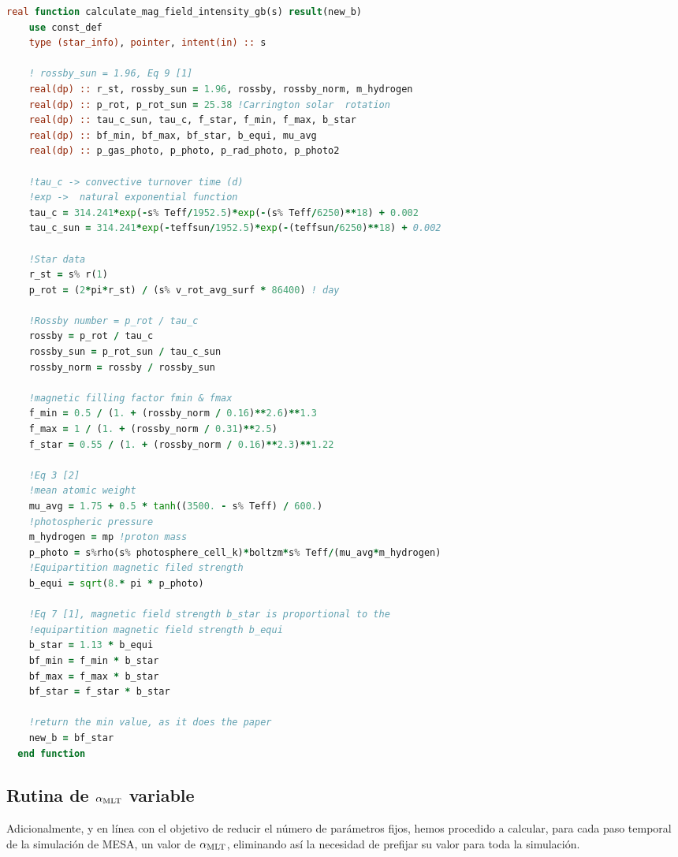 \begin{lstlisting}[language=Fortran, float, caption={Rutina de cálculo de intensidad de campo magnético.}, label={lst:jdot_mf_intensity}]
  real function calculate_mag_field_intensity_gb(s) result(new_b)
	use const_def
	type (star_info), pointer, intent(in) :: s
	
	! rossby_sun = 1.96, Eq 9 [1]
	real(dp) :: r_st, rossby_sun = 1.96, rossby, rossby_norm, m_hydrogen
	real(dp) :: p_rot, p_rot_sun = 25.38 !Carrington solar  rotation
	real(dp) :: tau_c_sun, tau_c, f_star, f_min, f_max, b_star
	real(dp) :: bf_min, bf_max, bf_star, b_equi, mu_avg
	real(dp) :: p_gas_photo, p_photo, p_rad_photo, p_photo2
	
	!tau_c -> convective turnover time (d)
	!exp ->  natural exponential function
	tau_c = 314.241*exp(-s% Teff/1952.5)*exp(-(s% Teff/6250)**18) + 0.002 
	tau_c_sun = 314.241*exp(-teffsun/1952.5)*exp(-(teffsun/6250)**18) + 0.002
	
	!Star data
	r_st = s% r(1)
	p_rot = (2*pi*r_st) / (s% v_rot_avg_surf * 86400) ! day
	
	!Rossby number = p_rot / tau_c
	rossby = p_rot / tau_c
	rossby_sun = p_rot_sun / tau_c_sun
	rossby_norm = rossby / rossby_sun
	
	!magnetic filling factor fmin & fmax
	f_min = 0.5 / (1. + (rossby_norm / 0.16)**2.6)**1.3 
	f_max = 1 / (1. + (rossby_norm / 0.31)**2.5)
	f_star = 0.55 / (1. + (rossby_norm / 0.16)**2.3)**1.22
	
	!Eq 3 [2]
	!mean atomic weight
	mu_avg = 1.75 + 0.5 * tanh((3500. - s% Teff) / 600.)
	!photospheric pressure 
	m_hydrogen = mp !proton mass       
	p_photo = s%rho(s% photosphere_cell_k)*boltzm*s% Teff/(mu_avg*m_hydrogen)
	!Equipartition magnetic filed strength
	b_equi = sqrt(8.* pi * p_photo)
	
	!Eq 7 [1], magnetic field strength b_star is proportional to the
	!equipartition magnetic field strength b_equi
	b_star = 1.13 * b_equi
	bf_min = f_min * b_star
	bf_max = f_max * b_star
	bf_star = f_star * b_star
	
	!return the min value, as it does the paper
	new_b = bf_star
  end function	
\end{lstlisting}

\subsection{Rutina de $\alpha_{\mathrm{MLT}}$ variable}
Adicionalmente, y en línea con el objetivo de reducir el número de parámetros fijos, hemos procedido a calcular, para cada paso temporal de la simulación de MESA, un valor de $\alpha_{\mathrm{MLT}}$, eliminando así la necesidad de prefijar su valor para toda la simulación.\par  

